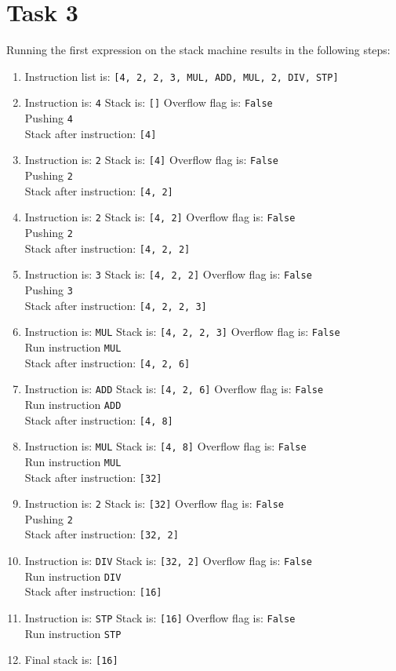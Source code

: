\section*{Task 3}
Running the first expression on the stack machine results in the following steps:
\begin{enumerate}
  \item Instruction list is:  \texttt{[4, 2, 2, 3, MUL, ADD, MUL, 2, DIV, STP]}
\item Instruction is: \texttt{4} Stack is: \texttt{[]} Overflow flag is: \texttt{False}\\
	Pushing \texttt{4}\\
	Stack after instruction:  \texttt{[4]}
\item Instruction is: \texttt{2} Stack is: \texttt{[4]} Overflow flag is: \texttt{False}\\
	Pushing \texttt{2}\\
	Stack after instruction:  \texttt{[4, 2]}
\item Instruction is: \texttt{2} Stack is: \texttt{[4, 2]} Overflow flag is: \texttt{False}\\
	Pushing \texttt{2}\\
	Stack after instruction:  \texttt{[4, 2, 2]}
\item Instruction is: \texttt{3} Stack is: \texttt{[4, 2, 2]} Overflow flag is: \texttt{False}\\
	Pushing \texttt{3}\\
	Stack after instruction:  \texttt{[4, 2, 2, 3]}
\item Instruction is: \texttt{MUL} Stack is: \texttt{[4, 2, 2, 3]} Overflow flag is: \texttt{False}\\
	Run instruction \texttt{MUL}\\
	Stack after instruction:  \texttt{[4, 2, 6]}
\item Instruction is: \texttt{ADD} Stack is: \texttt{[4, 2, 6]} Overflow flag is: \texttt{False}\\
	Run instruction \texttt{ADD}\\
	Stack after instruction:  \texttt{[4, 8]}
\item Instruction is: \texttt{MUL} Stack is: \texttt{[4, 8]} Overflow flag is: \texttt{False}\\
	Run instruction \texttt{MUL}\\
	Stack after instruction:  \texttt{[32]}
\item Instruction is: \texttt{2} Stack is: \texttt{[32]} Overflow flag is: \texttt{False}\\
	Pushing \texttt{2}\\
	Stack after instruction:  \texttt{[32, 2]}
\item Instruction is: \texttt{DIV} Stack is: \texttt{[32, 2]} Overflow flag is: \texttt{False}\\
	Run instruction \texttt{DIV}\\
	Stack after instruction:  \texttt{[16]}
\item Instruction is: \texttt{STP} Stack is: \texttt{[16]} Overflow flag is: \texttt{False}\\
	Run instruction \texttt{STP}
\item Final stack is:  \texttt{[16]}
\end{enumerate}

